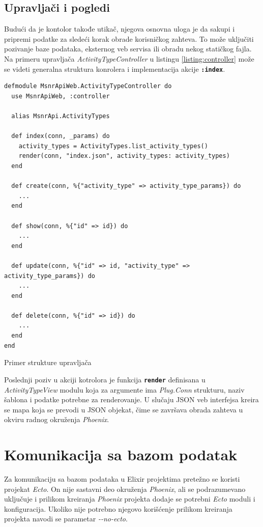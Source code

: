 \documentclass[12pt,oneside]{memoir}
\begin{document}
\subsection{Upravljači i pogledi}
Budući da je kontolor takođe utikač, njegova osnovna uloga je da sakupi i pripremi podatke za sledeći korak obrade korisničkog zahteva.
To može uključiti pozivanje baze podataka, eksternog veb servisa ili obradu nekog statičkog fajla. 
Na primeru upravljača \emph{ActivityTypeController} u listingu \ref{listing:controller} može se videti generalna struktura konrolera
i implementacija akcije \texttt{\textbf{:index}}.
\begin{listing}[!h]
\begin{verbatim}
defmodule MsnrApiWeb.ActivityTypeController do
  use MsnrApiWeb, :controller

  alias MsnrApi.ActivityTypes

  def index(conn, _params) do
    activity_types = ActivityTypes.list_activity_types()
    render(conn, "index.json", activity_types: activity_types)
  end

  def create(conn, %{"activity_type" => activity_type_params}) do
    ...
  end

  def show(conn, %{"id" => id}) do
    ...
  end

  def update(conn, %{"id" => id, "activity_type" => activity_type_params}) do
    ...
  end

  def delete(conn, %{"id" => id}) do
    ...
  end
end
\end{verbatim}
\caption{Primer strukture upravljača}
\label{listing:controller}
\end{listing}

Poslednji poziv u akciji kotrolora je funkcija \texttt{\textbf{render}} definisana u \emph{ActivityTypeView} modulu koja za argumente ima \emph{Plug.Conn} strukturu,
naziv šablona i podatke potrebne za renderovanje. U slučaju JSON veb interfejsa kreira se mapa koja se prevodi u JSON objekat,
čime se završava obrada zahteva u okviru radnog okruženja \emph{Phoenix}. 

\section{Komunikacija sa bazom podatak}
Za komunikaciju sa bazom podataka u Elixir projektima pretežno se koristi projekat \emph{Ecto}.
On nije sastavni deo okruženja \emph{Phoenix}, ali se podrazumevano uključuje i prilikom kreiranja
\emph{Phoenix} projekta dodaje se potrebni \emph{Ecto} moduli i konfiguracija. Ukoliko nije potrebno
njegovo korišćenje prilikom kreiranja projekta navodi se parametar \emph{-{}-no-ecto}.
\end{document}
